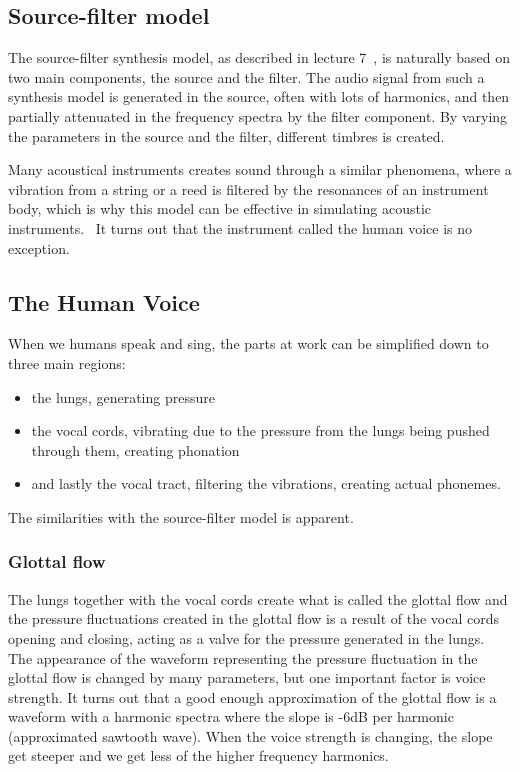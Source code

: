 \documentclass{article}
\begin{document}
\subsection{Source-filter model}
The source-filter synthesis model, as described in lecture 7~\cite{ternstrom7:20}, is naturally based on two main components, the source and the filter. The audio signal from such a synthesis model is generated in the source, often with lots of harmonics, and then partially attenuated in the frequency spectra by the filter component. By varying the parameters in the source and the filter, different timbres is created.

Many acoustical instruments creates sound through a similar phenomena, where a vibration from a string or a reed is filtered by the resonances of an instrument body, which is why this model can be effective in simulating acoustic instruments.~\cite{ternstrom7:20} It turns out that the instrument called the human voice is no exception.~\cite{ternstrom8:20}

\subsection{The Human Voice}
When we humans speak and sing, the parts at work can be simplified down to three main regions:~\cite{ternstrom8:20, hall:91}
\begin{itemize}
\item the lungs, generating pressure
\item the vocal cords, vibrating due to the pressure from the lungs being pushed through them, creating phonation
\item and lastly the vocal tract, filtering the vibrations, creating actual phonemes.
\end{itemize}

The similarities with the source-filter model is apparent.

\subsubsection{Glottal flow}
The lungs together with the vocal cords create what is called the glottal flow and the pressure fluctuations created in the glottal flow is a result of the vocal cords opening and closing, acting as a valve for the pressure generated in the lungs. The appearance of the waveform representing the pressure fluctuation in the glottal flow is changed by many parameters, but one important factor is voice strength. It turns out that a good enough approximation of the glottal flow is a waveform with a harmonic spectra where the slope is -6dB per harmonic (approximated sawtooth wave). When the voice strength is changing, the slope get steeper and we get less of the higher frequency harmonics.~\cite{ternstrom8:20, hall:91}
\end{document}
